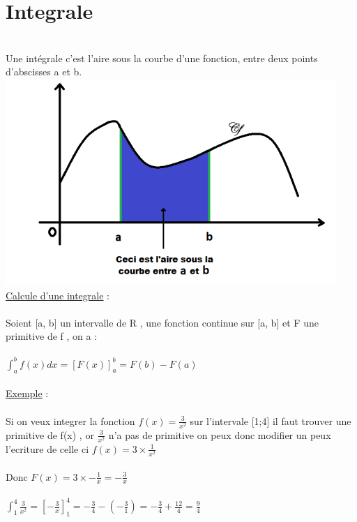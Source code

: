 \documentclass[a4paper,8pt,openany]{book}
\begin{document}
\section{Integrale}\\
Une intégrale c’est l’aire sous la courbe d’une fonction, entre deux points d’abscisses a et b. 
\\
\includegraphics[width=0.65\linewidth ,center]{img/integrale-aire-courbe.png}
\\
\underline{Calcule d'une integrale} : \\
\\
Soient [a, b] un intervalle de R , une fonction continue sur [a, b] et F une primitive de f , on a :\\
\\
$\int_a^b f(x) dx=[F(x)]^b_a=F(b)-F(a)$\\
\\
\underline{Exemple} : \\
\\
Si on veux integrer la fonction $f(x) = \frac{3}{x^2}$ sur l'intervale [1;4] il faut trouver une primitive de f(x) , or $\frac{3}{x^2}$ n'a pas de primitive on peux donc modifier un peux l'ecriture de celle ci $f(x)=3 \times \frac{1}{x^2}$\\
\\
Donc $F(x)=3\times -\frac{1}{x} = -\frac{3}{x}$\\
\\
$\int_1^4 \frac{3}{x^2} = [-\frac{3}{x}]^4_1 = -\frac{3}{4} - (-\frac{3}{1}) = -\frac{3}{4} + \frac{12}{4} = \frac{9}{4} $ \\
\end{document}
